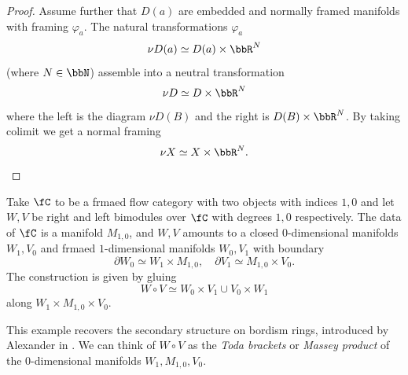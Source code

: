 \begin{proof}
    Assume further that $D(a)$ are embedded and normally framed manifolds with framing $\varphi_a$.  The natural transformations $\varphi_a$
    \begin{equation*}
        \nu D(a) \simeq D(a) \times \bbR^N
    \end{equation*}
    (where $N \in \bbN$) assemble into a neutral transformation
    \begin{equation*}
        \nu D \simeq D \times \bbR^N
    \end{equation*}
    where the left is the diagram $\nu D(B)$ and the right is $D(B) \times \bbR^{N}$. By taking colimit we get a normal framing
    \begin{equation*}
        \nu X \simeq X \times \bbR^{N}.
    \end{equation*}
    
\end{proof}


\begin{exmp}
    Take $\fC$ to be a frmaed flow category with two objects with indices $1,0$ and let $W,V$ be right and left bimodules over $\fC$ with degrees $1,0$ respectively. The data of $\fC$ is a manifold $M_{1,0}$, and $W,V$ amounts to a closed $0$-dimensional manifolds $W_1, V_0$ and frmaed $1$-dimensional manifolds $W_0, V_1$ with boundary
    \begin{equation*}
        \partial W_0 \simeq W_1 \times M_{1,0}, \quad \partial V_1 \simeq M_{1,0} \times V_0.
    \end{equation*}
    The construction is given by gluing
    \begin{equation*}
        W \circ V \simeq W_0 \times V_1 \cup V_0 \times W_1
    \end{equation*}
    along $W_1\times M_{1,0} \times V_0$.
\end{exmp}
This example recovers the secondary structure on bordism rings, introduced by Alexander in \cite{alexander1972cobordism}. We can think of $W \circ V$ as the \emph{Toda brackets} or \emph{Massey product} of the $0$-dimensional manifolds $W_1, M_{1,0}, V_0$.

